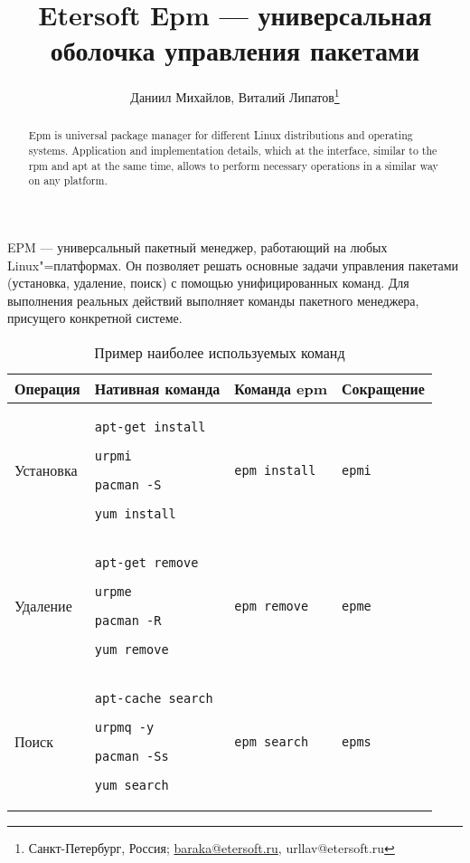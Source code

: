 \documentclass[10pt, a5paper]{article}
\def\vv!#1!{\texttt{#1}}
\begin{document}
\title{Etersoft Epm — универсальная оболочка управления пакетами}%

\author{Даниил Михайлов, Виталий Липатов\footnote{Санкт-Петербург, Россия; \url{baraka@etersoft.ru}, url{lav@etersoft.ru}}}
\maketitle

\begin{abstract}
Epm is universal package manager for different Linux distributions and operating systems. Application and implementation details, which at the interface, similar to the rpm and apt at the same time, allows to perform necessary operations in a similar way on any platform.
\end{abstract}

EPM — универсальный пакетный менеджер, работающий на любых Linux"=платформах. Он позволяет решать основные задачи управления пакетами (установка, удаление, поиск) с помощью унифицированных команд. Для выполнения реальных действий выполняет команды пакетного менеджера, присущего конкретной системе.

\begin{table}[h!]
  \centering
  \small
  \begin{tabular}{l|p{3cm}|l|l}
    \hline
    Операция   & Нативная команда  & Команда epm & Сокращение \\
    \hline
    Установка  & \vv!apt-get install! \par \vv!urpmi! \par \vv!pacman -S! \par \vv!yum install! & \vv!epm install! & \vv!epmi! \\
    Удаление   & \vv!apt-get remove! \par \vv!urpme! \par \vv!pacman -R! \par \vv!yum remove! & \vv!epm remove! & \vv!epme! \\
    Поиск      & \vv!apt-cache search! \par \vv!urpmq -y! \par \vv!pacman -Ss! \par \vv!yum search! & \vv!epm search! & \vv!epms! \\
    \hline
  \end{tabular}
  \caption{Пример наиболее используемых команд}
\end{table}
\end{document}
